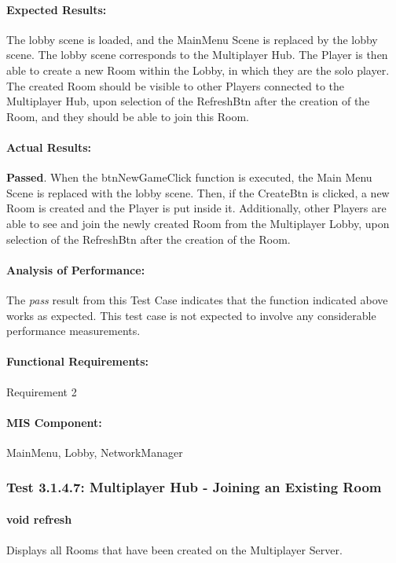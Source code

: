 \documentclass{article}
\begin{document}
    \paragraph{Expected Results:} The lobby scene is loaded, and the MainMenu Scene is replaced by the lobby scene. The lobby scene corresponds to the Multiplayer Hub. The Player is then able to create a new Room within the Lobby, in which they are the solo player. The created Room should be visible to other Players connected to the Multiplayer Hub, upon selection of the RefreshBtn after the creation of the Room, and they should be able to join this Room.
    \paragraph{Actual Results:} \textbf{Passed}. When the btnNewGameClick function is executed, the Main Menu Scene is replaced with the lobby scene. Then, if the CreateBtn is clicked, a new Room is created and the Player is put inside it. Additionally, other Players are able to see and join the newly created Room from the Multiplayer Lobby, upon selection of the RefreshBtn after the creation of the Room.
    \paragraph{Analysis of Performance:} The \emph{pass} result from this Test Case indicates that the function indicated above works as expected. This test case is not expected to involve any considerable performance measurements.
    \paragraph{Functional Requirements:} Requirement 2
    \paragraph{MIS Component:} MainMenu, Lobby, NetworkManager
    
     \subsubsection{Test 3.1.4.7: Multiplayer Hub - Joining an Existing Room}
    \paragraph{}\textbf{void refresh}
    \paragraph{} Displays all Rooms that have been created on the Multiplayer Server.
\end{document}
